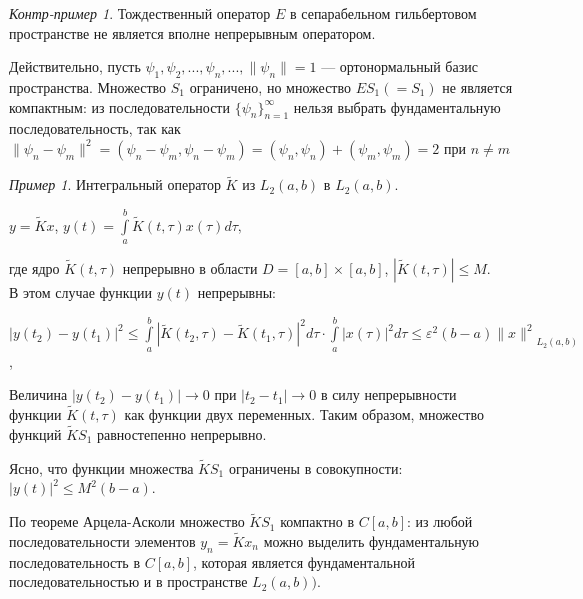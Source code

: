 \documentclass[12pt,a4paper,titlepage]{book}
\theoremstyle{definition}
\theoremstyle{plain}
\theoremstyle{remark}
\theoremstyle{remark}
\newtheorem*{example}{Пример}
\theoremstyle{remark}
\newtheorem*{cexample}{Контр-пример}
\theoremstyle{plain}
\begin{document}
\begin{cexample}Тождественный оператор $E$ в сепарабельном гильбертовом пространстве не является вполне непрерывным оператором.

Действительно, пусть $\psi_1,\psi_2,...,\psi_n,..., \lVert\psi_n\rVert =1$ --- ортонормальный базис пространства. Множество $S_1$ ограничено, но множество $ES_1 (=S_1)$ не является компактным: из последовательности $\lbrace \psi_n \rbrace_{n=1}^{\infty}$ нельзя выбрать фундаментальную последовательность, так как $\lVert\psi_n - \psi_m \rVert ^2=(\psi_n - \psi_m, \psi_n - \psi_m)= (\psi_n,\psi_n)+ (\psi_m,\psi_m)=2$ при $n \neq m$
\end{cexample}
\begin{example}Интегральный оператор $\widetilde{K}$ из $L_2(a,b)$ в $L_2(a,b)$.
\begin{center}
$y=\widetilde{K}x$, $y(t)=\int\limits_a^b \widetilde{K}(t, \tau)x(\tau)d\tau ,$\\
\end{center}
где ядро $\widetilde{K}(t, \tau)$ непрерывно в области $D=[a,b]\times[a,b]$, $|\widetilde{K}(t, \tau)|\leq M$.\\

В этом случае функции $y(t)$ непрерывны:

\begin{center}
$|y(t_2)-y(t_1)|^2\leq \int\limits_a^b |\widetilde{K}(t_2, \tau)-\widetilde{K}(t_1, \tau)|^2d\tau \cdot \int\limits_a^b |x(\tau)|^2 d\tau \leq \varepsilon^2 (b-a){\lVert x\rVert^2}_{L_2(a,b)}$,\\
\end{center}
Величина $|y(t_2)-y(t_1)|\rightarrow 0$ при $|t_2-t_1|\rightarrow 0$ в силу непрерывности функции $\widetilde{K}(t, \tau)$ как функции двух переменных. Таким образом, множество функций $\widetilde{K} S_1$ равностепенно непрерывно.

Ясно, что функции множества $\widetilde{K} S_1$ ограничены в совокупности: $|y(t)|^2 \leq M^2 (b-a)$.

По теореме Арцела-Асколи множество $\widetilde{K} S_1$ компактно в $C[a,b]$: из любой последовательности элементов $y_n=\widetilde{K} x_n$ можно выделить фундаментальную последовательность в $C[a,b]$, которая является фундаментальной последовательностью и в пространстве $L_2 (a,b))$.
\end{example}
\end{document}
